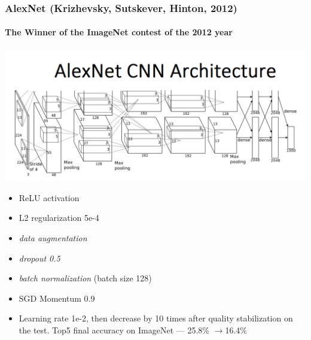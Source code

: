 \documentclass[fullscreen=true, bookmarks=true, hyperref={pdfencoding=unicode}]{beamer}
\begin{document}
\begin{frame}
  \frametitle{AlexNet (Krizhevsky, Sutskever, Hinton, 2012)}
  \framesubtitle{The Winner of the ImageNet contest of the 2012 year}
  \begin{center}
    \includegraphics[keepaspectratio,
                     width=0.7\paperwidth]{AlexNetCNN.png}
  \end{center}
  \begin{itemize}
     \small
     \pause \item ReLU activation
     \pause \item L2 regularization 5e-4
     \pause \item {\it data augmentation}
     \pause \item {\it dropout 0.5}
     \pause \item {\it batch normalization} (batch size 128)
     \pause \item SGD Momentum 0.9
     \pause \item Learning rate 1e-2, then decrease by 10 times after quality stabilization on the test. Top5 final accuracy on ImageNet — 25.8\% $\to$16.4\%
   \end{itemize}

\end{frame}
\end{document}
